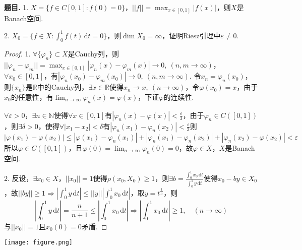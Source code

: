 \documentclass[12pt, a4paper, oneside]{ctexart}
\newcounter{problem}  %
\newenvironment{problem}[1][]{\stepcounter{problem}\par\noindent\textbf{题目\arabic{problem}. #1}}{\smallskip\par}
\let\leq=\leqslant %
\let\geq=\geqslant %
\def\R{\mathbb{R}}          %
\def\N{\mathbb{N}}          %
\def\d{\mathrm{d}}          %
\begin{document}
\begin{problem}
    1. $X = \{f\in C[0,1]:f(0)=0\}$，$||f||=\max_{x\in[0,1]}|f(x)|$，则$X$是Banach空间.

    2. $X_0=\{f\in X: \int_0^1f(t)\,\d t=0\}$，则$\dim X_0=\infty$，证明Riesz引理中$\varepsilon\neq 0$.
\end{problem}
\begin{proof}
    1. $\forall\{\varphi_n\}\subset X$是Cauchy列，则$||\varphi_n-\varphi_m||=\max_{x\in[0,1]}|\varphi_n(x)-\varphi_m(x)|\to0,\ (n,m\to\infty)$，$\forall x_0\in [0,1]$，有$|\varphi_n(x_0) - \varphi_m(x_0)|\to 0,\ (n,m\to\infty)$. 令$x_n = \varphi_n(x_0)$，则$\{x_n\}$是$\R$中的Cauchy列，$\exists x\in\R$使得$x_n\to x,\ (n\to\infty)$，令$\varphi(x_0) = x$，由于$x_0$的任意性，有$\lim_{n\to\infty}\varphi_n(x) = \varphi(x)$，下证$\varphi$的连续性.

    $\forall \varepsilon > 0$，$\exists n\in\N$使得$\forall x\in [0,1]$有$|\varphi_n(x)-\varphi(x)| < \frac{\varepsilon}{3}$，由于$\varphi_n\in C([0,1])$，则$\exists \delta >0$，使得$\forall |x_1-x_2| < \delta$有$|\varphi_n(x_1)-\varphi_n(x_2)| < \frac{\varepsilon}{3}$则
    \begin{equation*}
        |\varphi(x_1)-\varphi(x_2)|\leq |\varphi(x_1)-\varphi_n(x_1)|+|\varphi_n(x_1)-\varphi_n(x_2)|+|\varphi_n(x_2)-\varphi(x_2)| < \varepsilon
    \end{equation*}
    所以$\varphi\in C([0,1])$，且$\varphi(0) = \lim_{n\to\infty}\varphi_n(0) = 0$，故$\varphi \in X$，$X$是Banach空间.

    2. 反设，$\exists x_0\in X$，$||x_0|| = 1$使得$\rho(x_0, X_0)\geq 1$，则$\exists b = \frac{\int_0^1x_0\,\d t}{\int_0^1 y\,\d t}$使得$x_0-by \in X_0$，故$||by|| \geq 1\Rightarrow \left|\int_0^1y\,\d t\right|\leq ||y||\left|\int_0^1x_0\,\d t\right|$，取$y = t^{\frac{1}{n}}$，则
    \begin{equation*}
        \left|\int_0^1y\,\d t\right| = \frac{n}{n+1}\leq \left|\int_0^1x_0\,\d t\right|\Rightarrow \left|\int_0^1x_0\,\d t\right|\geq 1,\quad(n\to\infty)
    \end{equation*}
    与$||x_0|| = 1$且$x_0(0) = 0$矛盾.
\end{proof}
\iffalse
\centerline{
    \texttt{[image: figure.png]}
}
\renewcommand\arraystretch{0.8} %
\end{document}
